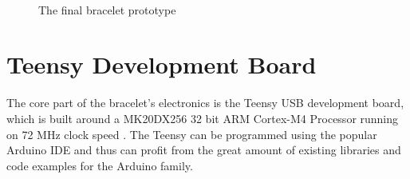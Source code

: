 \begin{figure}[bth]
	\myfloatalign
	 \quad
	 \\
	 \quad
	\caption{The final bracelet prototype}
	\label{fig:siliconefinal}
\end{figure}

\section{Teensy Development Board}
The core part of the bracelet's electronics is the Teensy USB development board, which is built around a MK20DX256 32 bit ARM Cortex-M4 Processor running on 72 MHz clock speed \cite{teensy_web}. The Teensy can be programmed using the popular Arduino IDE and thus can profit from the great amount of existing libraries and code examples for the Arduino family.

